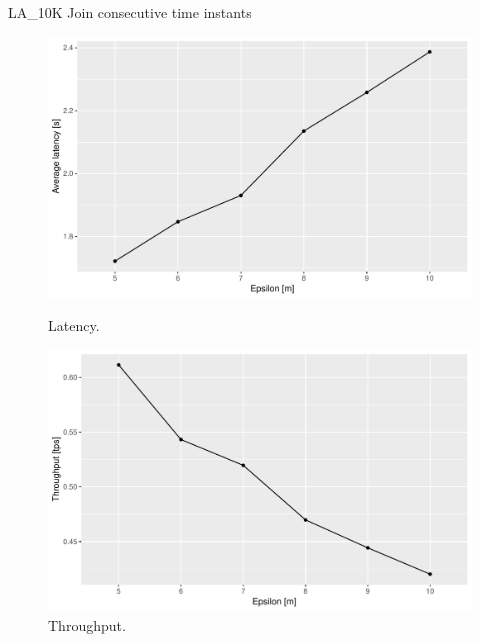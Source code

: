 \documentclass{beamer}
\begin{document}
\begin{frame}{LA\_10K Join consecutive time instants}
    \centering
    \begin{figure}
        \begin{minipage}[b]{0.48\textwidth}
            \includegraphics[width=\textwidth]{figures/LA_10K_JoinLatency}
            \caption{Latency.}
        \end{minipage}
        \hfill
        \begin{minipage}[b]{0.48\textwidth}
            \includegraphics[width=\textwidth]{figures/LA_10K_JoinThroughput}
            \caption{Throughput.}
        \end{minipage}
    \end{figure}    
\end{frame}
\end{document}
